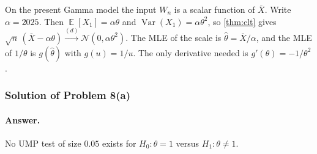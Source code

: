 \documentclass[11pt,a4paper]{article}
\DeclareMathOperator{\Var}{Var}
\DeclareMathOperator{\E}{\mathbb{E}}
\begin{document}
On the present Gamma model the input \( W_n \) is a scalar function of \( \overline{X} \). Write \( \alpha=2025 \). Then \( \E[X_1]=\alpha\theta \) and \( \Var(X_1)=\alpha\theta^{2} \), so \cref{thm:clt} gives \( \sqrt{n}\,(\overline{X}-\alpha\theta)\xrightarrow{(d)}\mathcal{N}(0,\alpha\theta^{2}) \). The MLE of the scale is \( \hat{\theta}=\overline{X}/\alpha \), and the MLE of \( 1/\theta \) is \( g(\hat{\theta}) \) with \( g(u)=1/u \). The only derivative needed is \( g'(\theta)=-1/\theta^{2} \).

\subsubsection{Solution of Problem 8(a)}

\paragraph{Answer.}
No UMP test of size \( 0.05 \) exists for \( H_0:\theta=1 \) versus \( H_1:\theta\neq 1 \).
\end{document}
